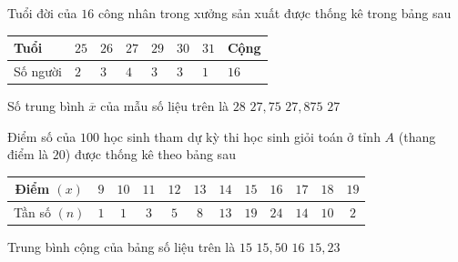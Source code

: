 \begin{ex}%
	Tuổi đời của $16$ công nhân trong xưởng sản xuất được  thống kê trong bảng sau
	\begin{center}
		\begin{tabular}{|l|l|l|l|l|l|l|l|}
			\hline Tuổi & $25$ & $26$  & $27$ & $29$ & $30$ & $31$ & Cộng\\
			\hline Số người & $2$ & $3$ & $4$ & $3$ & $3$ &  $1$ & $16$\\
			 \hline
		\end{tabular}
	\end{center}
	Số trung bình $\overline {x}$ của  mẫu số liệu trên là
	 \choice
		{$28$} 
		{\True  $27{,}75$}
		{$27{,}875$} 
		{$27$} 
\end{ex}

\begin{ex}%
	Điểm số của $100$ học  sinh tham dự kỳ thi học sinh giỏi toán ở tỉnh $A$ (thang điểm là $20$) được thống kê theo bảng sau
	\begin{center}
		\begin{tabular}{|c|c|c|c|c|c|c|c|c|c|c|c|}
			\hline 
			Điểm $(x)$ & $9$ & $10$ & $11$  & $12$ & $13$ & $14$ & $15$ & $16$ & $17$ & $18$ & $19$\\
			 \hline
			Tần số $(n)$ & $1$ & $1$ & $3$ & $5$ & $8$ & $13$ & $19$ & $24$ & $14$ & $10$  & $2$\\
			 \hline
		\end{tabular}
	\end{center}
	Trung bình cộng của  bảng số liệu trên là
	 \choice
		{$15$} 
		{$15{,}50$} 
		{$16$} 
		 {\True $15{,}23$}
\end{ex}

